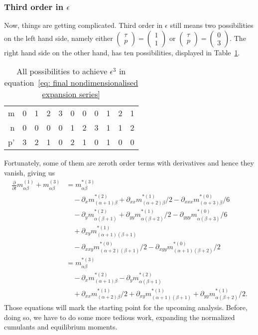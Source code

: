 \subsubsection{Third order in \texorpdfstring{$\epsilon$}{epsilon}}
\label{subs: Third order in epsilon}
Now, things are getting complicated.
Third order in $\epsilon$ still means two possibilities on the left hand side, namely either $\begin{pmatrix}\tau \\ p\end{pmatrix} = \begin{pmatrix} 1 \\ 1 \end{pmatrix}$ or $\begin{pmatrix}\tau \\ p\end{pmatrix} = \begin{pmatrix} 0 \\ 3 \end{pmatrix}$.
The right hand side on the other hand, has ten possibilities, displayed in Table~\ref{table: third order epsilon}.
\begin{table}[h]
  \centering
  \begin{tabular} {r || c | *{3}{c} | *{3}{c} | *{3}{c} }
    m  & 0 & 1 & 2 & 3 & 0 & 0 & 0 & 1 & 2 & 1 \\
    n  & 0 & 0 & 0 & 0 & 1 & 2 & 3 & 1 & 1 & 2 \\
    p' & 3 & 2 & 1 & 0 & 2 & 1 & 0 & 1 & 0 & 0
  \end{tabular}
  \caption{All possibilities to achieve $\epsilon^3$ in equation~\eqref{eq: final nondimensionalised expansion series}}
\label{table: third order epsilon}
\end{table}
Fortunately, some of them are zeroth order terms with derivatives and hence they vanish, giving us
\begin{equation}
  \label{eq: third order in epsilon}
  \begin{aligned}
    \frac{\partial}{\partial t} m_{\alpha\beta}^{(1)} + m_{\alpha\beta}^{(3)}
    & =  m_{\alpha\beta}^{*(3)} \\
    &\quad - \partial_x m_{(\alpha+1)\beta}^{*(2)} + \partial_{xx} m_{(\alpha+2)\beta}^{*(1)}/2 - \partial_{xxx} m_{(\alpha+3)\beta}^{*(0)}/6 \\
    &\quad - \partial_y m_{\alpha(\beta+1)}^{*(2)} + \partial_{yy} m_{\alpha(\beta+2)}^{*(1)}/2 - \partial_{yyy} m_{\alpha(\beta+3)}^{*(0)}/6 \\
    &\quad + \partial_{xy} m_{(\alpha+1)(\beta+1)}^{*(1)} \\
    &\quad - \partial_{xxy} m_{(\alpha+2)(\beta+1)}^{*(0)}/2 - \partial_{xyy} m_{(\alpha+1)(\beta+2)}^{*(0)}/2 \\
    & =  m_{\alpha\beta}^{*(3)} \\
    &\quad - \partial_x m_{(\alpha+1)\beta}^{*(2)} - \partial_y m_{\alpha(\beta+1)}^{*(2)}  \\
    &\quad  + \partial_{xx} m_{(\alpha+2)\beta}^{*(1)}/2 + \partial_{xy} m_{(\alpha+1)(\beta+1)}^{*(1)} + \partial_{yy} m_{\alpha(\beta+2)}^{*(1)}/2.
  \end{aligned}
\end{equation}
Those equations will mark the starting point for the upcoming analysis.
Before, doing so, we have to do some more tedious work, expanding the normalized cumulants and equilibrium moments.
